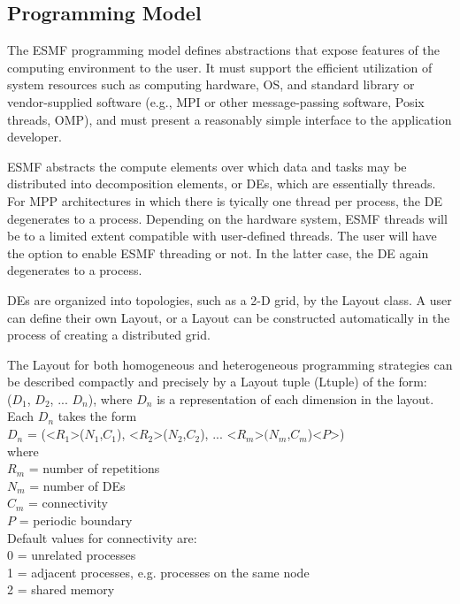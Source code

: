 \subsection{Programming Model}
\label{sec:progmodel}

The ESMF programming model defines abstractions that expose
features of the computing environment to the user.  It must support the 
efficient utilization of system resources such as   
computing hardware, OS, and standard library or vendor-supplied 
software (e.g., MPI or other message-passing software, Posix threads, OMP),
and must present a reasonably simple interface to the application 
developer.  

ESMF abstracts the compute elements over which data and tasks may be
distributed into decomposition elements, or DEs, which
are essentially threads.  For MPP architectures in which there
is tyically one thread per process, the DE degenerates to a process.
Depending on the hardware system, ESMF threads will be to a limited 
extent compatible with user-defined threads.  The user will have 
the option to enable ESMF threading or not.  In the latter case, the
DE again degenerates to a process.

DEs are organized into topologies, such as a 2-D grid, by the Layout 
class.  A user can define their own Layout, or a Layout can be 
constructed automatically in the process of creating a distributed 
grid.  

The Layout for both homogeneous and heterogeneous programming
strategies can be described compactly and precisely by a Layout 
tuple (Ltuple) of the form: \\
($D_{1}$, $D_{2}$, ... $D_{n}$), where $D_{n}$ is a representation of
each dimension in the layout.  \\
Each $D_{n}$ takes the form \\
$D_{n}$ = (<$R_{1}$>($N_{1}$,$C_{1}$), <$R_{2}$>($N_{2}$,$C_{2}$), ... <$R_{m}$>$(N_{m}$,$C_{m}$)<$P$>) \\
where \\
$R_{m}$ = number of repetitions \\
$N_{m}$ = number of DEs \\
$C_{m}$ = connectivity \\
$P$ = periodic boundary \\

Default values for connectivity are: \\
0 = unrelated processes \\
1 = adjacent processes, e.g. processes on the same node\\
2 = shared memory \\

